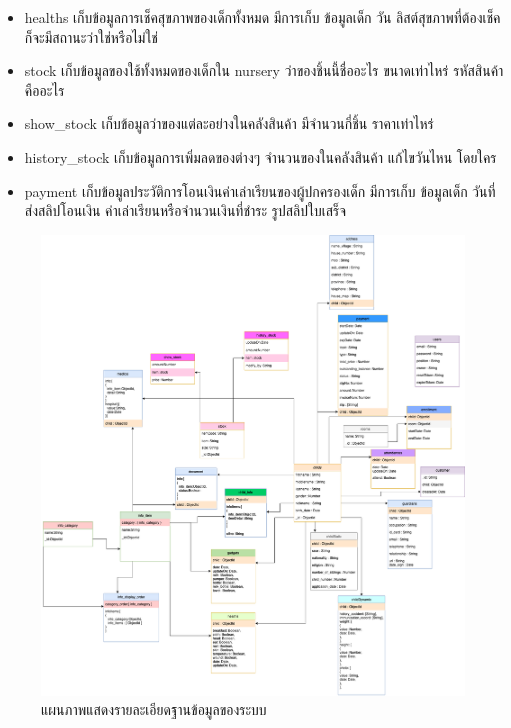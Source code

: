 \begin{itemize}
    \item healths เก็บข้อมูลการเช็คสุขภาพของเด็กทั้งหมด มีการเก็บ ข้อมูลเด็ก วัน ลิสต์สุขภาพที่ต้องเช็ค ก็จะมีสถานะว่าใช่หรือไม่ใช่
    \item stock เก็บข้อมูลของใช้ทั้งหมดของเด็กใน nursery ว่าของชิ้นนี้ชื่ออะไร ขนาดเท่าไหร่ รหัสสินค้าคืออะไร
    \item show\_stock เก็บข้อมูลว่าของแต่ละอย่างในคลังสินค้า มีจำนวนกี่ชิ้น ราคาเท่าไหร่
    \item history\_stock เก็บข้อมูลการเพิ่มลดของต่างๆ จำนวนของในคลังสินค้า แก้ไขวันไหน โดยใคร
    \item payment เก็บข้อมูลประวัติการโอนเงินค่าเล่าเรียนของผู้ปกครองเด็ก มีการเก็บ ข้อมูลเด็ก วันที่ส่งสลิปโอนเงิน ค่าเล่าเรียนหรือจำนวนเงินที่ชำระ รูปสลิปใบเสร็จ 
  \end{itemize}
%
  \begin{figure}
    \begin{center}
    \includegraphics[width=\linewidth]{images/NurseryDiagram.png}
    \end{center}
  \caption{แผนภาพแสดงรายละเอียดฐานข้อมูลของระบบ}
  \label{fig:DatabaseDiagram}
\end{figure}

